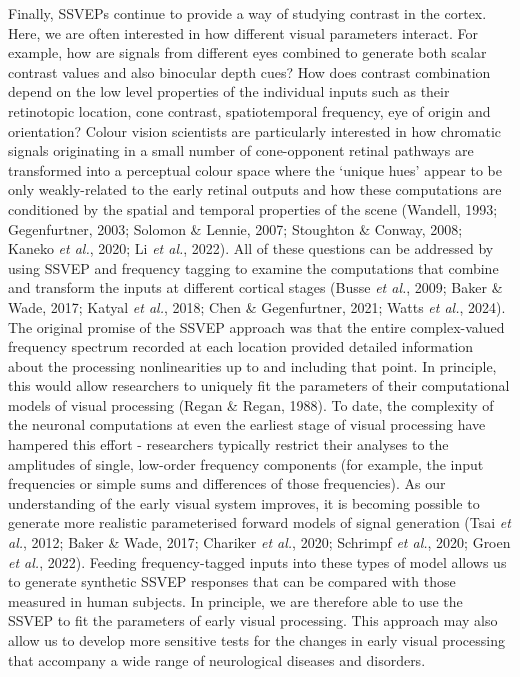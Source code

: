 \documentclass[
  letterpaper,
  DIV=11,
  numbers=noendperiod]{scrartcl}
\begin{document}
Finally, SSVEPs continue to provide a way of studying contrast in the
cortex. Here, we are often interested in how different visual parameters
interact. For example, how are signals from different eyes combined to
generate both scalar contrast values and also binocular depth cues? How
does contrast combination depend on the low level properties of the
individual inputs such as their retinotopic location, cone contrast,
spatiotemporal frequency, eye of origin and orientation? Colour vision
scientists are particularly interested in how chromatic signals
originating in a small number of cone-opponent retinal pathways are
transformed into a perceptual colour space where the `unique hues'
appear to be only weakly-related to the early retinal outputs and how
these computations are conditioned by the spatial and temporal
properties of the scene (Wandell, 1993; Gegenfurtner, 2003; Solomon \&
Lennie, 2007; Stoughton \& Conway, 2008; Kaneko \emph{et al.}, 2020; Li
\emph{et al.}, 2022). All of these questions can be addressed by using
SSVEP and frequency tagging to examine the computations that combine and
transform the inputs at different cortical stages (Busse \emph{et al.},
2009; Baker \& Wade, 2017; Katyal \emph{et al.}, 2018; Chen \&
Gegenfurtner, 2021; Watts \emph{et al.}, 2024). The original promise of
the SSVEP approach was that the entire complex-valued frequency spectrum
recorded at each location provided detailed information about the
processing nonlinearities up to and including that point. In principle,
this would allow researchers to uniquely fit the parameters of their
computational models of visual processing (Regan \& Regan, 1988). To
date, the complexity of the neuronal computations at even the earliest
stage of visual processing have hampered this effort - researchers
typically restrict their analyses to the amplitudes of single, low-order
frequency components (for example, the input frequencies or simple sums
and differences of those frequencies). As our understanding of the early
visual system improves, it is becoming possible to generate more
realistic parameterised forward models of signal generation (Tsai
\emph{et al.}, 2012; Baker \& Wade, 2017; Chariker \emph{et al.}, 2020;
Schrimpf \emph{et al.}, 2020; Groen \emph{et al.}, 2022). Feeding
frequency-tagged inputs into these types of model allows us to generate
synthetic SSVEP responses that can be compared with those measured in
human subjects. In principle, we are therefore able to use the SSVEP to
fit the parameters of early visual processing. This approach may also
allow us to develop more sensitive tests for the changes in early visual
processing that accompany a wide range of neurological diseases and
disorders.
\end{document}
